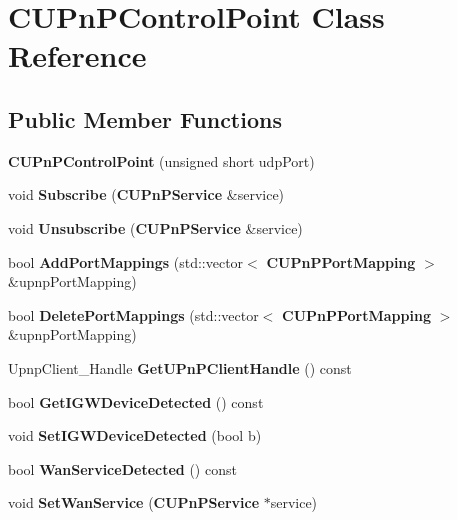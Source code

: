 \section{CUPnPControlPoint Class Reference}
\label{classCUPnPControlPoint}
\subsection*{Public Member Functions}
\begin{DoxyCompactItemize}
\item 
{\bfseries CUPnPControlPoint} (unsigned short udpPort)\label{classCUPnPControlPoint_aa75c3f04daa58586196875ee71dddf8c}

\item 
void {\bfseries Subscribe} ({\bf CUPnPService} \&service)\label{classCUPnPControlPoint_ac05357aa682936bf1422ff4577cea912}

\item 
void {\bfseries Unsubscribe} ({\bf CUPnPService} \&service)\label{classCUPnPControlPoint_a90c83af7f3de0935292901112afef014}

\item 
bool {\bfseries AddPortMappings} (std::vector$<$ {\bf CUPnPPortMapping} $>$ \&upnpPortMapping)\label{classCUPnPControlPoint_af359f6974d3d3a009577fe0e32ac110e}

\item 
bool {\bfseries DeletePortMappings} (std::vector$<$ {\bf CUPnPPortMapping} $>$ \&upnpPortMapping)\label{classCUPnPControlPoint_aa3848f0020b37b81a2e6089de58ed0f6}

\item 
UpnpClient\_\-Handle {\bfseries GetUPnPClientHandle} () const \label{classCUPnPControlPoint_abb683d0a2c4a30eaf4db3b693080045d}

\item 
bool {\bfseries GetIGWDeviceDetected} () const \label{classCUPnPControlPoint_a2f9085963e1f5b2874c3486947d88d4d}

\item 
void {\bfseries SetIGWDeviceDetected} (bool b)\label{classCUPnPControlPoint_aa9f6df7f92eb57b70246bb2ed6f01e75}

\item 
bool {\bfseries WanServiceDetected} () const \label{classCUPnPControlPoint_a32b5f97872c1d114a16640780d172682}

\item 
void {\bfseries SetWanService} ({\bf CUPnPService} $\ast$service)\label{classCUPnPControlPoint_ab22bd105cc3f46ab68f3d6f6992b14b7}

\end{DoxyCompactItemize}
